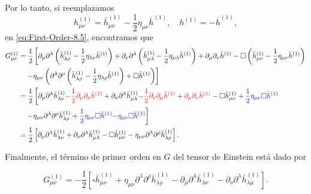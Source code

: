 \documentclass[letterpaper,11pt]{article}
\begin{document}
Por lo tanto, si reemplazamos 
\begin{equation}
h_{\mu\nu}^{(1)} = \bar{h}_{\mu\nu}^{(1)} - \frac{1}{2} \eta_{\mu\nu} \bar{h}^{(1)}, \quad h^{(1)} = - \bar{h}^{(1)},
\end{equation}
en \eqref{eq:First-Order-8.5}, encontramos que
\begin{align}
G_{\mu\nu}^{(1)} &= \frac{1}{2} \left[\partial_{\mu} \partial^{\lambda} \left(\bar{h}_{\lambda\nu}^{(1)} - \frac{1}{2} \eta_{\lambda\nu} \bar{h}^{(1)}\right) + \partial_{\nu} \partial^{\lambda} \left(\bar{h}_{\mu\lambda}^{(1)} - \frac{1}{2} \eta_{\mu\lambda} \bar{h}^{(1)} \right)  + \partial_{\mu} \partial_{\nu} \bar{h}^{(1)}  - \square \left( \bar{h}_{\mu\nu}^{(1)} - \frac{1}{2} \eta_{\mu\nu} \bar{h}^{(1)}\right) \right. \nonumber\\
&\quad \left.-  \eta_{\mu\nu} \left( \partial^{\lambda}\partial^{\rho} \left(\bar{h}_{\lambda\rho}^{(1)} - \frac{1}{2} \eta_{\lambda\rho} \bar{h}^{(1)} \right) + \square \bar{h}^{(1)} \right) \right]  \nonumber\\
&= \frac{1}{2} \left[ \partial_{\mu} \partial^{\lambda} \bar{h}_{\lambda\nu}^{(1)} \textcolor{red}{- \frac{1}{2} \partial_{\mu} \partial_{\nu} \bar{h}^{(1)}} + \partial_{\nu}\partial^{\lambda} \bar{h}_{\mu\lambda}^{(1)} \textcolor{red}{- \frac{1}{2} \partial_{\nu} \partial_{\mu} \bar{h}^{(1)}} + \textcolor{red}{\partial_{\mu}\partial_{\nu} \bar{h}^{(1)}} - \square \bar{h}_{\mu\nu}^{(1)} + \textcolor{blue}{\frac{1}{2} \eta_{\mu\nu} \square \bar{h}^{(1)}} \right. \nonumber\\
&\quad \left. - \eta_{\mu\nu} \partial^{\lambda}\partial^{\rho} \bar{h}_{\lambda\rho}^{(1)} + \textcolor{blue}{\frac{1}{2} \eta_{\mu\nu} \square \bar{h}^{(1)}} \textcolor{blue}{- \eta_{\mu\nu} \square \bar{h}^{(1)}} \right] \nonumber\\
&= \frac{1}{2} \left[\partial_{\mu}\partial^{\lambda} \bar{h}^{(1)}_{\lambda\nu} + \partial_{\nu}\partial^{\lambda} \bar{h}^{(1)}_{\mu\lambda} - \square \bar{h}^{(1)}_{\mu\nu} - \eta_{\mu\nu} \partial^{\lambda}\partial^{\rho} \bar{h}^{(1)}_{\lambda\rho} \right].
\end{align}

Finalmente, el término de primer orden en $G$ del tensor de Einstein está dado por
\begin{shaded}
\begin{equation}
G_{\mu\nu}^{(1)} = - \frac{1}{2} \left[ \square \bar{h}_{\mu\nu}^{(1)} + \eta_{\mu\nu} \partial^{\lambda}\partial^{\rho}\bar{h}_{\lambda\rho}^{(1)}- \partial_{\mu}\partial^{\lambda} \bar{h}_{\lambda \nu}^{(1)} - \partial_{\nu}\partial^{\lambda} \bar{h}_{\lambda\mu}^{(1)}\right].
\end{equation}
\end{shaded}
\end{document}
